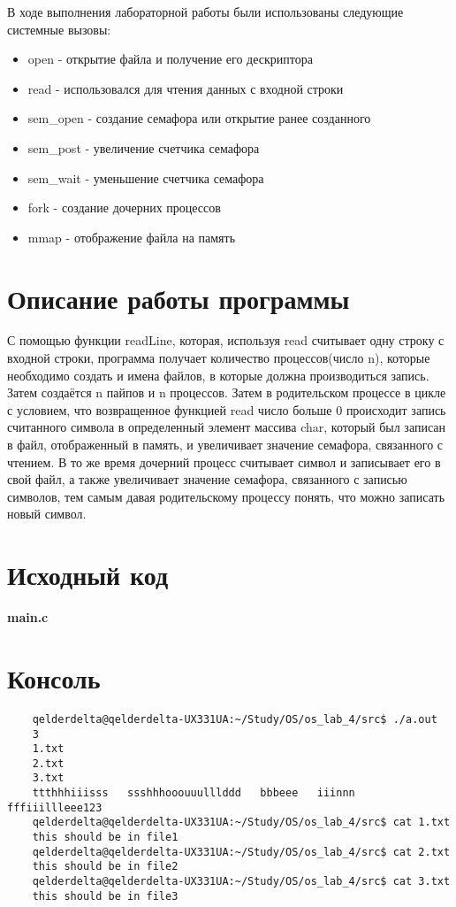 \documentclass[a4paper, 12pt]{article}
\begin{document}
В ходе выполнения лабораторной работы были использованы следующие системные вызовы:

\begin{itemize}
	\item open - открытие файла и получение его дескриптора
	\item read - использовался для чтения данных с входной строки
	\item sem\_open - создание семафора или открытие ранее созданного
	\item sem\_post - увеличение счетчика семафора
	\item sem\_wait - уменьшение счетчика семафора
	\item fork - создание дочерних процессов
	\item mmap - отображение файла на память
\end{itemize}
\section{Описание работы программы}

С помощью функции readLine, которая, используя read считывает одну строку с входной строки, программа получает количество процессов(число n), которые необходимо создать и имена файлов, в которые должна производиться запись. Затем создаётся n пайпов и n процессов. Затем в родительском процессе в цикле с условием, что возвращенное функцией read число больше 0 происходит запись считанного символа в определенный элемент массива char, который был записан в файл, отображенный в память, и увеличивает значение семафора, связанного с чтением. В то же время дочерний процесс считывает символ и записывает его в свой файл, а также увеличивает значение семафора, связанного с записью символов, тем самым давая родительскому процессу понять, что можно записать новый символ.

\newpage

\section{Исходный код}

\textbf{\large{main.c}}

\newpage
\section{Консоль}

\begin{verbatim}
	qelderdelta@qelderdelta-UX331UA:~/Study/OS/os_lab_4/src$ ./a.out
	3
	1.txt
	2.txt
	3.txt
	ttthhhiiisss   ssshhhooouuulllddd   bbbeee   iiinnn   fffiiillleee123                            
	qelderdelta@qelderdelta-UX331UA:~/Study/OS/os_lab_4/src$ cat 1.txt
	this should be in file1
	qelderdelta@qelderdelta-UX331UA:~/Study/OS/os_lab_4/src$ cat 2.txt
	this should be in file2
	qelderdelta@qelderdelta-UX331UA:~/Study/OS/os_lab_4/src$ cat 3.txt
	this should be in file3
\end{verbatim}
\newpage
\end{document}
